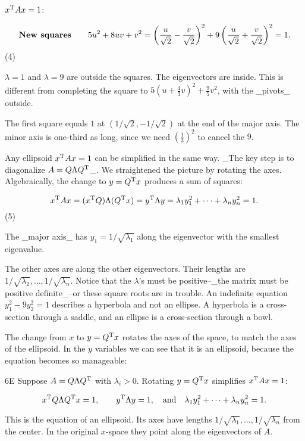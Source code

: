 \(x^{\rm T}Ax=1\):

\[\mbox{\bf New squares}\qquad 5u^{2}+8uv+v^{2}=\left(\frac{u}{\sqrt{2}}-\frac{v}{ \sqrt{2}}\right)^{2}+9\left(\frac{u}{\sqrt{2}}+\frac{v}{\sqrt{2}}\right)^{2}=1.\] (4)

\(\lambda=1\) and \(\lambda=9\) are outside the squares. The eigenvectors are inside. This is different from completing the square to \(5(u+\frac{4}{3}v)^{2}+\frac{9}{5}v^{2}\), with the _pivots_ outside.

The first square equals \(1\) at \((1/\sqrt{2},-1/\sqrt{2})\) at the end of the major axis. The minor axis is one-third as long, since we need \((\frac{1}{3})^{2}\) to cancel the \(9\).

Any ellipsoid \(x^{\rm T}Ax=1\) can be simplified in the same way. _The key step is to diagonalize \(A=Q\Lambda Q^{\rm T}\)_. We straightened the picture by rotating the axes. Algebraically, the change to \(y=Q^{\rm T}x\) produces a sum of squares:

\[x^{\rm T}Ax=(x^{\rm T}Q)\Lambda(Q^{\rm T}x)=y^{\rm T}\Lambda y=\lambda_{1}y_{1 }^{2}+\cdots+\lambda_{n}y_{n}^{2}=1.\] (5)

The _major axis_ has \(y_{1}=1/\sqrt{\lambda_{1}}\) along the eigenvector with the smallest eigenvalue.

The other axes are along the other eigenvectors. Their lengths are \(1/\sqrt{\lambda_{2}},\ldots,1/\sqrt{\lambda_{n}}\). Notice that the \(\lambda\)'s must be positive--_the matrix must be positive definite_--or these square roots are in trouble. An indefinite equation \(y_{1}^{2}-9y_{2}^{2}=1\) describes a hyperbola and not an ellipse. A hyperbola is a cross-section through a saddle, and an ellipse is a cross-section through a bowl.

The change from \(x\) to \(y=Q^{\rm T}x\) rotates the axes of the space, to match the axes of the ellipsoid. In the \(y\) variables we can see that it is an ellipsoid, because the equation becomes so manageable:

6E Suppose \(A=Q\Lambda Q^{\rm T}\) with \(\lambda_{i}>0\). Rotating \(y=Q^{\rm T}x\) simplifies \(x^{\rm T}Ax=1\):

\[x^{\rm T}Q\Lambda Q^{\rm T}x=1,\qquad y^{\rm T}\Lambda y=1,\quad\mbox{and} \quad\lambda_{1}y_{1}^{2}+\cdots+\lambda_{n}y_{n}^{2}=1.\]

This is the equation of an ellipsoid. Its axes have lengths \(1/\sqrt{\lambda_{1}},\ldots,1/\sqrt{\lambda_{n}}\) from the center. In the original \(x\)-space they point along the eigenvectors of \(A\).

 
